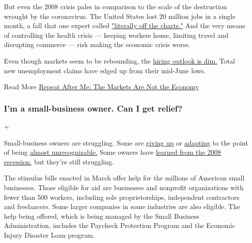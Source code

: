But even the 2008 crisis pales in comparison to the scale of the
destruction wrought by the coronavirus. The United States lost 20
million jobs in a single month, a fall that one expert called
\href{https://www.nytimes3xbfgragh.onion/interactive/2020/05/08/business/economy/april-jobs-report.html}{"literally
off the charts."} And the very means of controlling the health crisis
--- keeping workers home, limiting travel and disrupting commerce ---
risk making the economic crisis worse.

Even though markets seem to be rebounding, the
\href{https://www.nytimes3xbfgragh.onion/2020/07/09/business/economy/unemployment-claims-coronavirus.html}{hiring
outlook is dim.} Total new unemployment claims have edged up from their
mid-June lows.

 Read More
\href{https://www.nytimes3xbfgragh.onion/2020/05/10/business/stock-market-economy-coronavirus.html}{Repeat
After Me: The Markets Are Not the Economy}

\hypertarget{im-a-small-business-owner-can-i-get-relief}{%
\subsubsection{I'm a small-business owner. Can I get
relief?}\label{im-a-small-business-owner-can-i-get-relief}}

+

Small-business owners are struggling. Some are
\href{https://www.nytimes3xbfgragh.onion/2020/07/13/business/small-businesses-coronavirus.html}{giving
up} or
\href{https://www.nytimes3xbfgragh.onion/2020/06/26/business/small-business-coronavirus-survival.html}{adapting}
to the point of being
\href{https://www.nytimes3xbfgragh.onion/2020/05/18/business/small-business-coronavirus-pandemic-mikes-organic.html}{almost
unrecognizable.} Some owners have
\href{https://www.nytimes3xbfgragh.onion/2020/06/23/business/coronavirus-great-recession-2008-lessons.html}{learned
from the 2008 recession,} but they're still struggling.

The stimulus bills enacted in March offer help for the millions of
American small businesses. Those eligible for aid are businesses and
nonprofit organizations with fewer than 500 workers, including sole
proprietorships, independent contractors and freelancers. Some larger
companies in some industries are also eligible. The help being offered,
which is being managed by the Small Business Administration, includes
the Paycheck Protection Program and the Economic Injury Disaster Loan
program.


